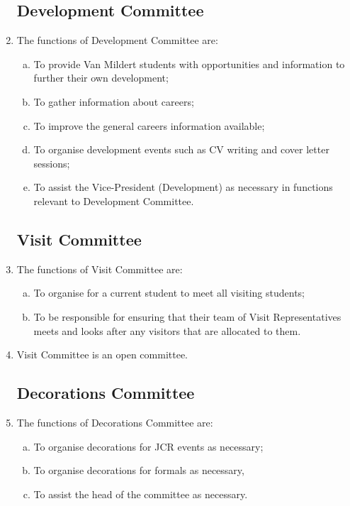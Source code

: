 \documentclass[12pt]{article}  %
\begin{document}
\begin{enumerate}
	\subsection{Development Committee}
	\item The functions of Development Committee are:
	\begin{enumerate}[(a)]
		\item To provide Van Mildert students with opportunities and information to further their own development;
		\item To gather information about careers;
		\item To improve the general careers information available;
		\item To organise development events such as CV writing and cover letter sessions;
		\item To assist the Vice-President (Development) as necessary in functions relevant to Development Committee.
	\end{enumerate}
	\subsection{Visit Committee}
	\item The functions of Visit Committee are:
	\begin{enumerate}[(a)]
		\item To organise for a current student to meet all visiting students;
		\item To be responsible for ensuring that their team of Visit Representatives meets and looks after any visitors that are allocated to them.
	\end{enumerate}
	\item Visit Committee is an open committee.
	\subsection{Decorations Committee}
	\item The functions of Decorations Committee are:
	\begin{enumerate}[(a)]
		\item To organise decorations for JCR events as necessary;
		\item To organise decorations for formals as necessary,
		\item To assist the head of the committee as necessary.
	\end{enumerate}

\end{enumerate}
\end{document}

